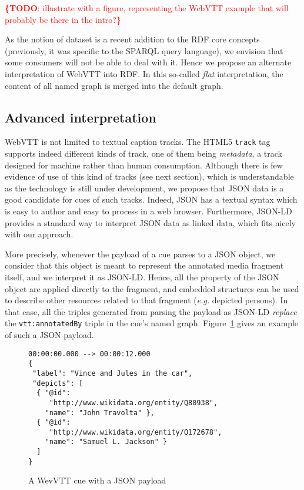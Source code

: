 \documentclass{sig-alternate}
\newcommand{\todo}[1]{\noindent\textcolor{red}{{\bf \{TODO}: #1{\bf \}}}}
\newcommand{\vtt}[1]{\texttt{vtt:#1}}
\begin{document}
\todo{illustrate with a figure, representing the WebVTT example that will probably be there in the intro?}

As the notion of dataset is a recent addition to the RDF core concepts
(previously, it was specific to the SPARQL query language),
we envision that some consumers will not be able to deal with it.
Hence we propose an alternate interpretation of WebVTT into RDF.
In this so-called \emph{flat} interpretation,
the content of all named graph is merged into the default graph.

\subsection{Advanced interpretation}

WebVTT is not limited to textual caption tracks.
The HTML5 \texttt{track} tag supports indeed different kinds of track,
one of them being \textit{metadata},
a track designed for machine rather than human consumption.
Although there is few evidence of use of this kind of tracks (see next section),
which is understandable as the technology is still under development,
we propose that JSON data is a good candidate for cues of such tracks.
Indeed, JSON has a textual syntax which is easy to author
and easy to process in a web browser.
Furthermore, JSON-LD~\cite{sporny2013jsonld} provides
a standard way to interpret JSON data as linked data,
which fits nicely with our approach.

More precisely, whenever the payload of a cue parses to a JSON object,
we consider that this object is meant to represent the annotated media fragment itself,
and we interpret it as JSON-LD.
Hence, all the property of the JSON object are applied directly to the fragment,
and embedded structures can be used to describe other resources related to that fragment
(\textit{e.g.} depicted persons).
In that case, all the triples generated from parsing the payload as JSON-LD
\emph{replace} the \vtt{annotatedBy} triple in the cue's named graph.
Figure~\ref{fig:json-payload} gives an example of such a JSON payload.

\begin{figure}
\begin{verbatim}
00:00:00.000 --> 00:00:12.000
{
 "label": "Vince and Jules in the car",
 "depicts": [
  { "@id":
     "http://www.wikidata.org/entity/Q80938",
    "name": "John Travolta" },
  { "@id":
     "http://www.wikidata.org/entity/Q172678",
    "name": "Samuel L. Jackson" }
  ]
}
\end{verbatim}
\label{fig:json-payload}
\caption{A WevVTT cue with a JSON payload}
\end{figure}
\end{document}

